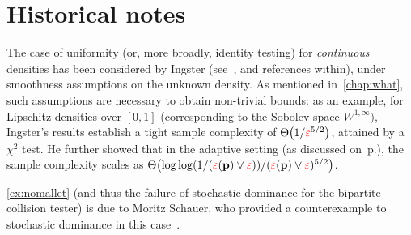 \section{Historical notes}
\tbc
\citet{GoldreichR00} 
\cite{Paninski08}
\cite{ChanDVV14}
\cite{AcharyaDK15}
\cite{DiakonikolasGPP18}
\cite{BlaisCG17}
\cite{HuangM13}
\cite{AcharyaCT19b,AcharyaCHST20,AminJM20}


The case of uniformity (or, more broadly, identity testing) for \emph{continuous} densities has been considered by Ingster (see~\citet{Ingster97}, and references within), under smoothness assumptions on the unknown density. As mentioned in~\cref{chap:what}, such assumptions are necessary to obtain non-trivial bounds: as an example, for Lipschitz densities over $[0,1]$ (corresponding to the Sobolev space $W^{1,\infty})$, Ingster's results establish a tight sample complexity of $\bigTheta{1/\dst^{5/2}}$, attained by a $\chi^2$ test. He further showed that in the adaptive setting (as discussed on~p.\pageref{chap:what:adaptive}), the sample complexity scales as $\bigTheta{\log\log(1/(\dst(\p)\lor \dst))/(\dst(\p)\lor \dst)^{5/2}}$.

\tbc

\cref{ex:nomallet} (and thus the failure of stochastic dominance for the bipartite collision tester) is due to Moritz Schauer, who provided a counterexample to stochastic dominance in this case~\citep{MathSE-schauer}.

